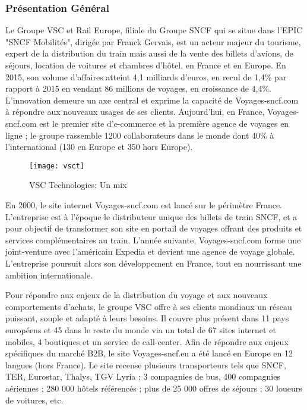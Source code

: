 \subsubsection{Présentation Général}

Le Groupe VSC et Rail Europe, filiale du Groupe SNCF qui se situe dans l'EPIC "SNCF Mobilités", dirigée par Franck Gervais, est un acteur majeur du tourisme, expert de la distribution du train mais aussi de la vente des billets d'avions, de séjours, location de voitures et chambres d'hôtel, en France et en Europe. En 2015, son volume d’affaires atteint 4,1 milliards d’euros, en recul de 1,4\% par rapport à 2015 en vendant 86 millions de voyages, en croissance de 4,4\%. L’innovation demeure un axe central et exprime la capacité de Voyages-sncf.com à répondre aux nouveaux usages de ses clients. Aujourd’hui, en France, Voyages-sncf.com est le premier site d’e-commerce et la première agence de voyages en ligne ; le groupe rassemble 1200 collaborateurs dans le monde dont 40\% à l'international (130 en Europe et 350 hors Europe).

\begin{figure}[ht]
 \centering
 \texttt{[image: vsct]}
 \caption{VSC Technologies: Un mix}
 \label{fig:vsct}
\end{figure}

En 2000, le site internet Voyages-sncf.com est lancé sur le périmètre France. L’entreprise est à l’époque le distributeur unique des billets de train SNCF, et a pour objectif de transformer son site en portail de voyages offrant des produits et services complémentaires au train. L’année suivante, Voyages-sncf.com forme une joint-venture avec l’américain Expedia et devient une agence de voyage globale. L’entreprise poursuit alors son développement en France, tout en nourrissant une ambition internationale.

Pour répondre aux enjeux de la distribution du voyage et aux nouveaux comportements d’achats, le groupe VSC offre à ses clients mondiaux un réseau puissant, souple et adapté à leurs besoins. Il couvre plus présent dans 11 pays européens et 45 dans le reste du monde via un total de 67 sites internet et mobiles, 4 boutiques et un service de call-center. Afin de répondre aux enjeux spécifiques du marché B2B, le site Voyages-sncf.eu a été lancé en Europe en 12 langues (hors France).
Le site recense plusieurs transporteurs tels que SNCF, TER, Eurostar, Thalys, TGV Lyria ; 3 compagnies de bus, 400 compagnies aériennes ; 280 000 hôtels référencés ; plus de 25 000 offres de séjours ; 30 loueurs de voitures, etc.

